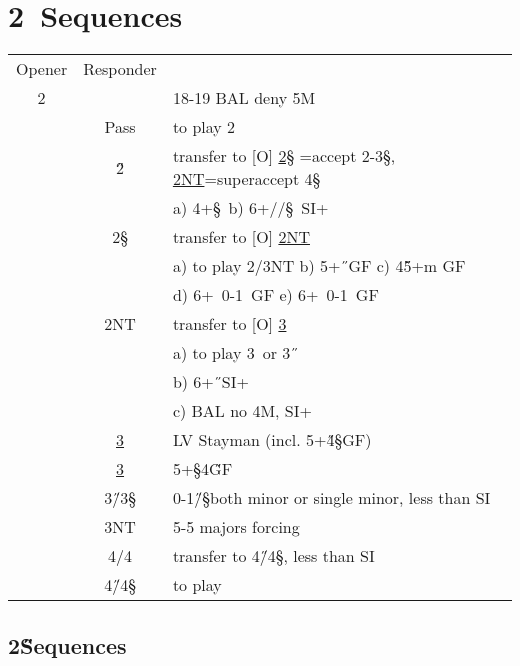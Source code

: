 \newpage


\chapter{2\D\ Sequences}

\hypertarget{2d}{}
\begin{longtable}{C{\bidlength} C{\bidlength} | l}
Opener & Responder \\
2\D  & & 18-19 BAL deny 5M\\
\hline\hline
&Pass& to play 2\D\ \\
&2\H & transfer to [O] \hyperlink{2d2h2s}{2\S} =accept 2-3\S,
                       \hyperlink{2d2h2n}{2NT}=superaccept 4\S\\
&    & a) 4+\S\ b) 6+\C/\D/\S\ SI+ \\
&2\S & transfer to [O] \hyperlink{2d2s2n}{2NT} \\
&    & a) to play 2/3NT b) 5+\H\ GF c) 4\H5+m GF \\
&    & d) 6+\C\ 0-1\D\ GF e) 6+\D\ 0-1\C\ GF \\
&2NT & transfer to [O] \hyperlink{2d2n3c}{3\C} \\
&    & a) to play 3\C\ or 3\H\ \\
&    & b) 6+\H\ SI+ \\
&    & c) BAL no 4M, SI+ \\
&\hyperlink{2d3c}{3\C} & LV Stayman (incl. 5+\H 4\S GF) \\
&\hyperlink{2d3d}{3\D} & 5+\S 4\H GF \\
&3\H/3\S & 0-1\H/\S both minor or single minor, less than SI \\
&3NT & 5-5 majors forcing \\
&4\C/4\D & transfer to 4\H/4\S, less than SI \\
&4\H/4\S & to play \\
\end{longtable}

\section{2\H Sequences}

